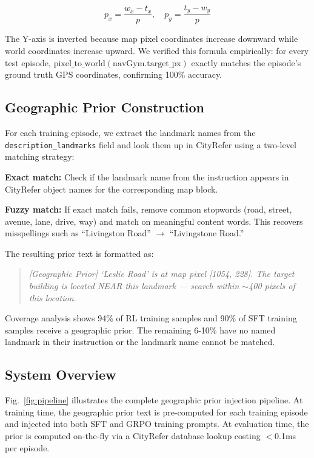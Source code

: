 \documentclass[conference]{IEEEtran}
\begin{document}
\begin{equation}
p_x = \frac{w_x - t_x}{p}, \quad p_y = \frac{t_y - w_y}{p}
\label{eq:coord}
\end{equation}

The Y-axis is inverted because map pixel coordinates increase downward while world coordinates increase upward. We verified this formula empirically: for every test episode, $\text{pixel\_to\_world}(\text{navGym.target\_px})$ exactly matches the episode's ground truth GPS coordinates, confirming 100\% accuracy.

\subsection{Geographic Prior Construction}
For each training episode, we extract the landmark names from the \texttt{description\_landmarks} field and look them up in CityRefer using a two-level matching strategy:

\textbf{Exact match:} Check if the landmark name from the instruction appears in CityRefer object names for the corresponding map block.

\textbf{Fuzzy match:} If exact match fails, remove common stopwords (road, street, avenue, lane, drive, way) and match on meaningful content words. This recovers misspellings such as ``Livingston Road'' $\rightarrow$ ``Livingstone Road.''

The resulting prior text is formatted as:
\begin{quote}
\textit{[Geographic Prior] `Leslie Road' is at map pixel [1054, 228]. The target building is located NEAR this landmark --- search within $\sim$400 pixels of this location.}
\end{quote}

Coverage analysis shows 94\% of RL training samples and 90\% of SFT training samples receive a geographic prior. The remaining 6-10\% have no named landmark in their instruction or the landmark name cannot be matched.

\subsection{System Overview}

Fig.~\ref{fig:pipeline} illustrates the complete geographic prior injection pipeline. At training time, the geographic prior text is pre-computed for each training episode and injected into both SFT and GRPO training prompts. At evaluation time, the prior is computed on-the-fly via a CityRefer database lookup costing $<$0.1ms per episode.
\end{document}
